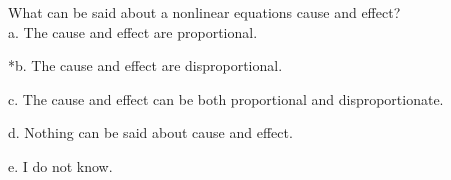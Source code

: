 
What can be said about a nonlinear equations cause and effect? \\

a. The cause and effect are proportional.

*b. The cause and effect are disproportional.

c.  The cause and effect can be both proportional and disproportionate.

d. Nothing can be said about cause and effect.

e. I do not know. \\
